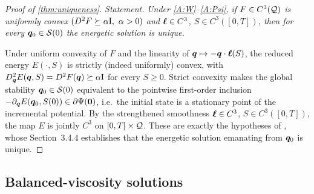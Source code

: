 \begin{proof}[Proof of \cref{thm:uniqueness}]
\emph{Statement.} \emph{Under \ref{A:W}--\ref{A:Psi}, if $F\in C^3(\mathcal{Q})$
is uniformly convex $(D^2F\succeq\alpha\mathrm{I},\ \alpha>0)$ and
$\bm{\ell}\in C^3$, $S\in C^3([0,T])$, then for every
$\bm{q}_0\in\mathcal S(0)$ the energetic solution is unique.}

\smallskip
Under uniform convexity of $F$ and the linearity of
$\bm{q}\mapsto-\bm{q}\cdot\bm{\ell}(S)$, the reduced energy $E(\cdot,S)$ is
strictly (indeed uniformly) convex, with
$D^2_{\bm{q}}E(\bm{q},S)=D^2F(\bm{q})\succeq\alpha\mathrm{I}$ for every $S\ge0$.
Strict convexity makes the global stability $\bm{q}_0\in\mathcal S(0)$
equivalent to the pointwise first-order inclusion
$-\partial_{\bm{q}}E(\bm{q}_0,S(0))\in\partial\Psi(\bm{0})$, i.e.\ the
initial state is a stationary point of the incremental potential. By the
strengthened smoothness $\bm{\ell}\in C^3$, $S\in C^3([0,T])$, the map $E$
is jointly $C^3$ on $[0,T]\times\mathcal{Q}$. These are exactly the hypotheses of
\cite[Thm.~3.4.7]{MielkeRoubicek}, whose Section~3.4.4 establishes that
the energetic solution emanating from $\bm{q}_0$ is unique.
\end{proof}

\subsection{Balanced-viscosity solutions}


